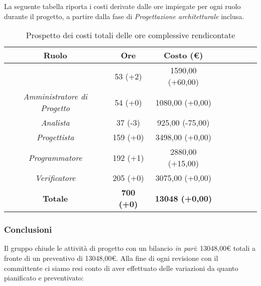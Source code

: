 La seguente tabella riporta i costi derivate dalle ore impiegate per ogni ruolo durante il progetto, a partire dalla fase di \textit{Progettazione architetturale} inclusa.

\begin{table}[H]
		\begin{center}
			\setlength{\aboverulesep}{0pt}
			\setlength{\belowrulesep}{0pt}
			\setlength{\extrarowheight}{.75ex}
			\begin{tabular}{ c c c c c c c c }
				\rowcolor{AzzurroGruppo!30} 
				\textbf{Ruolo} & \textbf{Ore} & \textbf{Costo (\euro{})}\\
				\toprule
				\RdP{}   & 53 (+2) & 1590,00 (+60,00)\\
				\textit{Amministratore di Progetto} & 54 (+0) & 1080,00 (+0,00) \\
				\textit{Analista}       & 37 (-3) & 925,00 (-75,00) \\
				\textit{Progettista}    & 159 (+0) & 3498,00 (+0,00) \\
				\textit{Programmatore}  & 192 (+1) & 2880,00 (+15,00) \\
				\textit{Verificatore}   & 205 (+0) & 3075,00 (+0,00)\\
				\textbf{Totale} & \textbf{700 (+0)} & \textbf{13048 (+0,00)} \\
				\bottomrule
			\end{tabular}
			\caption{Prospetto dei costi totali delle ore complessive rendicontate}
		\end{center}
	\end{table}
	
\subsubsection{Conclusioni}
Il gruppo chiude le attività di progetto con un bilancio \textit{in pari}: 13048,00\euro{} totali a fronte di un preventivo di 13048,00\euro{}.\newline{}
Alla fine di ogni revisione con il committente ci siamo resi conto di aver effettuato delle variazioni da quanto pianificato e preventivato:


